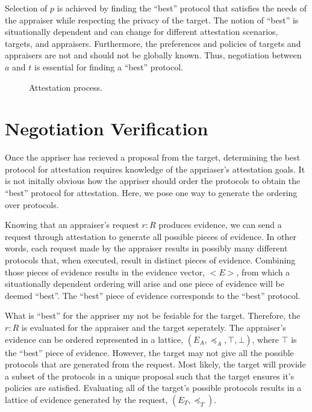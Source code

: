 \documentclass[sigconf,authordraft]{acmart}
\begin{document}
Selection of $p$ is achieved by finding the ``best'' protocol that
satisfies the needs of the appraiser while respecting the privacy of
the target. The notion of ``best'' is situationally dependent and can
change for different attestation scenarios, targets, and appraisers.
Furthermore, the preferences and policies of targets and appraisers
are not and should not be globally known.  Thus, negotiation between
$a$ and $t$ is essential for finding a ``best'' protocol.

\begin{figure}[hbtp]
  \centering 
  \caption[Attestation process]{Attestation process.}
  \label{fig:sequence-fig}
\end{figure}

\section{Negotiation Verification}

Once the appriser has recieved a proposal from the target, determining
the best protocol for attestation requires knowledge of the
appriaser's attestation goals. It is not initally obvious how the
appriser should order the protocols to obtain the ``best'' protocol for
attestation. Here, we pose one way to generate the ordering over
protocols.

Knowing that an appraiser's request $r:R$ produces evidence, we can
send a request through attestation to generate all possible pieces of
evidence. In other words, each request made by the appraiser
results in possibly many different protocols that, when executed,
result in distinct pieces of evidence. Combining those pieces of
evidence results in the evidence vector,  $<E>$, from which a situationally
dependent ordering will arise and one piece of evidence will be deemed
``best''. The ``best'' piece of evidence corresponds to the ``best'' protocol. 

What is ``best'' for the appriser my not be fesiable for the
target. Therefore, the $r:R$ is evaluated for the appraiser and the
target seperately. The appraiser's evidence can be ordered represented
in a lattice, $(E_A,\preceq_A, \top, \bot)$, where $\top$ is the
``best'' piece of evidence. However, the target may not give all the
possible protocols that are generated from the request. Most likely,
the target will provide a subset of the protocols in a unique proposal
such that the target ensures it's policies are satisfied. Evaluating
all of the target's possible protocols results in a lattice of
evidence generated by the request, $(E_T,\preceq_T)$.
\end{document}
